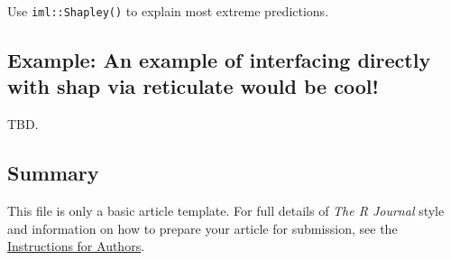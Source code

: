Use \texttt{iml::Shapley()} to explain most extreme predictions.

\hypertarget{example-an-example-of-interfacing-directly-with-shap-via-reticulate-would-be-cool}{%
\subsection{Example: An example of interfacing directly with shap via
reticulate would be
cool!}\label{example-an-example-of-interfacing-directly-with-shap-via-reticulate-would-be-cool}}

TBD.

\hypertarget{summary}{%
\subsection{Summary}\label{summary}}

This file is only a basic article template. For full details of
\emph{The R Journal} style and information on how to prepare your
article for submission, see the
\href{https://journal.r-project.org/share/author-guide.pdf}{Instructions
for Authors}.




\address{%
Brandon M. Greenwell\\
University of Cincinnati\\%
2925 Campus Green Dr\\ Cincinnati, OH 45221\\ United States of
America\\ ORCiD---\href{https://orcid.org/0000-0002-8120-0084}{0000-0002-8120-0084}\\
%
%
%
\\\href{mailto:greenwell.brandon@gmail.com}{\nolinkurl{greenwell.brandon@gmail.com}}
}

\address{%
\ldots{}\\
University of Cincinnati\\%
2925 Campus Green Dr\\ Cincinnati, OH 45221\\ United States of
America\\ ORCiD---\href{https://orcid.org/0000-0002-8120-0084}{0000-0002-8120-0084}\\
%
%
%
\\\href{mailto:greenwell.brandon@gmail.com}{\nolinkurl{greenwell.brandon@gmail.com}}
}
